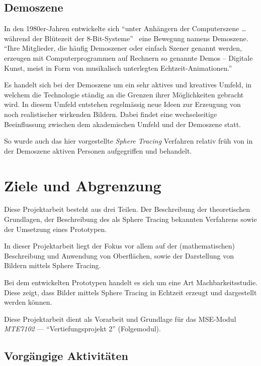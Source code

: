 \subsection{Demoszene}
\label{subsec:demoscene}

In den 1980er-Jahren entwickelte sich ``unter Anhängern der
Computerszene \dots{} während der Blütezeit der
8-Bit-Systeme''~\parencite{wikipedia_foundation_demoszene_2015} eine Bewegung
namens Demoszene. ``Ihre Mitglieder, die häufig Demoszener oder einfach
Szener genannt werden, erzeugen mit Computerprogrammen auf Rechnern so
genannte Demos – Digitale Kunst, meist in Form von musikalisch
unterlegten
Echtzeit-Animationen.''~\parencite{wikipedia_foundation_demoszene_2015}

Es handelt sich bei der Demoszene um ein sehr aktives und kreatives
Umfeld, in welchem die Technologie ständig an die Grenzen ihrer
Möglichkeiten gebracht wird. In diesem Umfeld entstehen regelmässig neue
Ideen zur Erzeugung von noch realistischer wirkenden Bildern. Dabei
findet eine wechselseitige Beeinflussung zwischen dem akademischen
Umfeld und der Demoszene statt.

So wurde auch das hier vorgestellte \textit{Sphere Tracing} Verfahren
relativ früh von in der Demoszene aktiven Personen aufgegriffen und
behandelt.

\section{Ziele und Abgrenzung}
\label{sec:objectives}

Diese Projektarbeit besteht aus drei Teilen. Der Beschreibung der
theoretischen Grundlagen, der Beschreibung des als Sphere Tracing
bekannten Verfahrens sowie der Umsetzung eines Prototypen.

In dieser Projektarbeit liegt der Fokus vor allem auf der
(mathematischen) Beschreibung und Anwendung von Oberflächen,
sowie der Darstellung von Bildern mittels Sphere Tracing.

Bei dem entwickelten Prototypen handelt es sich um eine Art
Machbarkeitsstudie. Diese zeigt, dass Bilder mittels Sphere Tracing in
Echtzeit erzeugt und dargestellt werden können.

Diese Projektarbeit dient als Vorarbeit und Grundlage für das MSE-Modul
\textit{MTE7102} --- ``Vertiefungsprojekt 2'' (Folgemodul).

\subsection{Vorgängige Aktivitäten}
\label{subsec:preliminaries}

